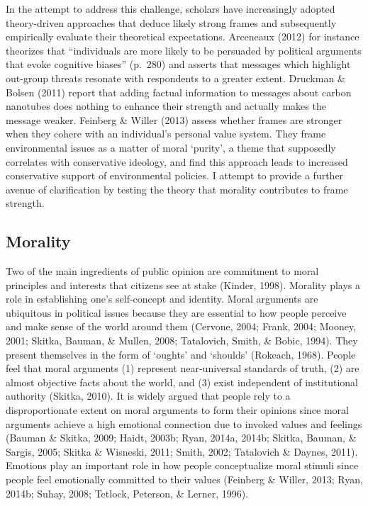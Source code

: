 \documentclass[12pt,econ]{sources/authesis}
\begin{document}
In the attempt to address this challenge, scholars have increasingly adopted theory-driven approaches that deduce likely strong frames and subsequently empirically evaluate their theoretical expectations. Arceneaux (2012) for instance theorizes that ``individuals are more likely to be persuaded by political arguments that evoke cognitive biases'' (p.~280) and asserts that messages which highlight out-group threats resonate with respondents to a greater extent. Druckman \& Bolsen (2011) report that adding factual information to messages about carbon nanotubes does nothing to enhance their strength and actually makes the message weaker. Feinberg \& Willer (2013) assess whether frames are stronger when they cohere with an individual's personal value system. They frame environmental issues as a matter of moral `purity', a theme that supposedly correlates with conservative ideology, and find this approach leads to increased conservative support of environmental policies. I attempt to provide a further avenue of clarification by testing the theory that morality contributes to frame strength.

\hypertarget{framing-theory-morality}{%
\subsection{Morality}\label{framing-theory-morality}}

Two of the main ingredients of public opinion are commitment to moral principles and interests that citizens see at stake (Kinder, 1998). Morality plays a role in establishing one's self-concept and identity. Moral arguments are ubiquitous in political issues because they are essential to how people perceive and make sense of the world around them (Cervone, 2004; Frank, 2004; Mooney, 2001; Skitka, Bauman, \& Mullen, 2008; Tatalovich, Smith, \& Bobic, 1994). They present themselves in the form of `oughts' and `shoulds' (Rokeach, 1968). People feel that moral arguments (1) represent near-universal standards of truth, (2) are almost objective facts about the world, and (3) exist independent of institutional authority (Skitka, 2010). It is widely argued that people rely to a disproportionate extent on moral arguments to form their opinions since moral arguments achieve a high emotional connection due to invoked values and feelings (Bauman \& Skitka, 2009; Haidt, 2003b; Ryan, 2014a, 2014b; Skitka, Bauman, \& Sargis, 2005; Skitka \& Wisneski, 2011; Smith, 2002; Tatalovich \& Daynes, 2011). Emotions play an important role in how people conceptualize moral stimuli since people feel emotionally committed to their values (Feinberg \& Willer, 2013; Ryan, 2014b; Suhay, 2008; Tetlock, Peterson, \& Lerner, 1996).
\end{document}
